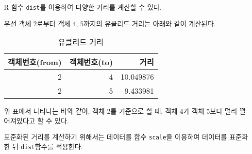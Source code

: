 \documentclass[]{book}
\newenvironment{Shaded}{\begin{snugshade}}{\end{snugshade}}
\newcommand{\DataTypeTok}[1]{\textcolor[rgb]{0.13,0.29,0.53}{#1}}
\newcommand{\DecValTok}[1]{\textcolor[rgb]{0.00,0.00,0.81}{#1}}
\newcommand{\KeywordTok}[1]{\textcolor[rgb]{0.13,0.29,0.53}{\textbf{#1}}}
\newcommand{\NormalTok}[1]{#1}
\newcommand{\OperatorTok}[1]{\textcolor[rgb]{0.81,0.36,0.00}{\textbf{#1}}}
\newcommand{\OtherTok}[1]{\textcolor[rgb]{0.56,0.35,0.01}{#1}}
\newcommand{\StringTok}[1]{\textcolor[rgb]{0.31,0.60,0.02}{#1}}
\begin{document}
R 함수 \texttt{dist}를 이용하여 다양한 거리를 계산할 수 있다.

우선 객체 2로부터 객체 4, 5까지의 유클리드 거리는 아래와 같이 계산된다.

\begin{Shaded}
\end{Shaded}

\begin{table}[t]

\caption{\label{tab:euclidean-dist}유클리드 거리}
\centering
\begin{tabular}{rrr}
\toprule
객체번호(from) & 객체번호(to) & 거리\\
\midrule
2 & 4 & 10.049876\\
2 & 5 & 9.433981\\
\bottomrule
\end{tabular}
\end{table}

위 표에서 나타나는 바와 같이, 객체 2를 기준으로 할 때, 객체 4가 객체 5보다 멀리 떨어져있다고 할 수 있다.

표준화된 거리를 계산하기 위해서는 데이터를 함수 \texttt{scale}을 이용하여 데이터를 표준화한 뒤 \texttt{dist}함수를 적용한다.
\end{document}
